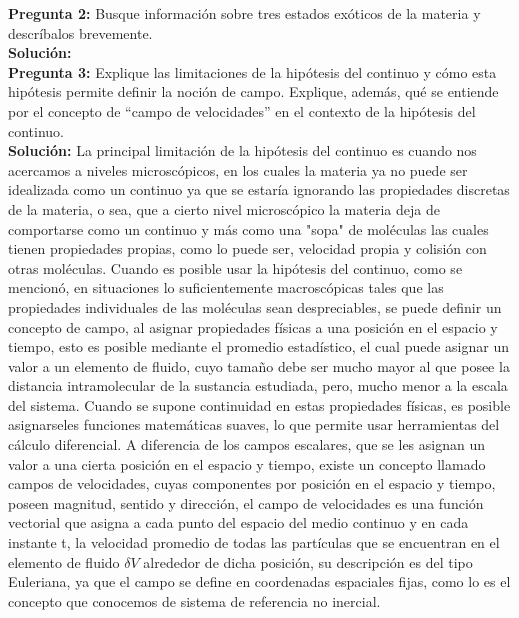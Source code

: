\documentclass[11pt,letterpaper]{article}
\begin{document}
\textbf{Pregunta 2:} Busque información sobre tres estados exóticos de la materia y descríbalos brevemente. \\
\textbf{Solución:} 
\\


\textbf{Pregunta 3:} Explique las limitaciones de la hipótesis del continuo y cómo esta hipótesis permite
definir la noción de campo. Explique, además, qué se entiende por el concepto de “campo de
velocidades” en el contexto de la hipótesis del continuo. \\
\textbf{Solución:}
La principal limitación de la hipótesis del continuo es cuando nos acercamos a niveles microscópicos, en los cuales la materia ya no puede ser idealizada como un continuo ya que se estaría ignorando las propiedades discretas de la materia, o sea, que a cierto nivel microscópico la materia deja de comportarse como un continuo y más como una "sopa" de moléculas las cuales tienen propiedades propias, como lo puede ser, velocidad propia y  colisión con otras moléculas. Cuando es posible usar la hipótesis del continuo, como se mencionó, en situaciones lo suficientemente macroscópicas tales que las propiedades individuales de las moléculas sean despreciables, se puede definir un concepto de campo, al asignar propiedades físicas a una posición en el espacio y tiempo, esto es posible mediante el promedio estadístico, el cual puede asignar un valor a un elemento de fluido, cuyo tamaño debe ser mucho mayor al que posee la distancia intramolecular de la sustancia estudiada, pero, mucho menor a la escala del sistema. Cuando se supone continuidad en estas propiedades físicas, es posible asignarseles funciones matemáticas suaves, lo que permite usar herramientas del cálculo diferencial. A diferencia de los campos escalares, que se les asignan un valor a una cierta posición en el espacio y tiempo, existe un concepto llamado campos de velocidades, cuyas componentes por posición en el espacio y tiempo, poseen magnitud, sentido y dirección, el campo de velocidades es una función vectorial que asigna a cada punto del espacio del medio continuo y en cada instante t, la velocidad promedio de todas las partículas que se encuentran en el elemento de fluido $\delta V$ alrededor de dicha posición, su descripción es del tipo Euleriana, ya que el campo se define en coordenadas espaciales fijas, como lo es el concepto que conocemos de sistema de referencia no inercial.
\end{document}

